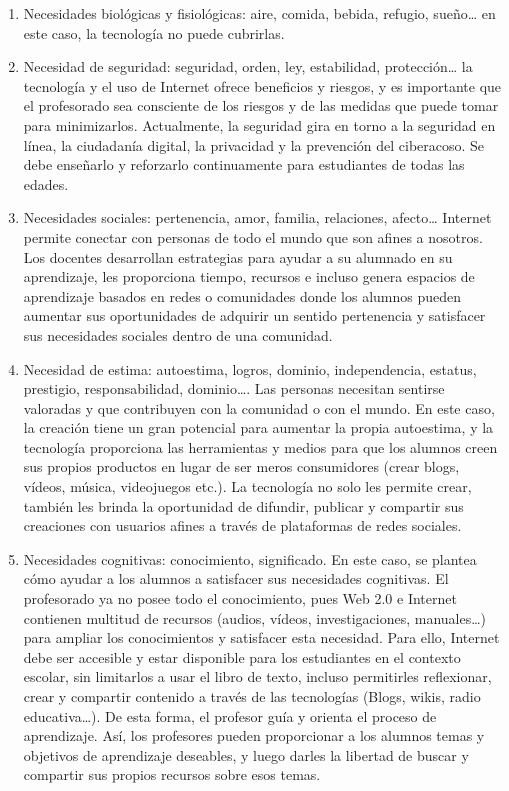 \documentclass[spanish]{textolivre}
\begin{document}
\begin{enumerate}
    \item Necesidades biológicas y fisiológicas: aire, comida, bebida, refugio, sueño… en este caso, la tecnología no puede cubrirlas.
    \item Necesidad de seguridad: seguridad, orden, ley, estabilidad, protección… la tecnología y el uso de Internet ofrece beneficios y riesgos, y es importante que el profesorado sea consciente de los riesgos y de las medidas que puede tomar para minimizarlos. Actualmente, la seguridad gira en torno a la seguridad en línea, la ciudadanía digital, la privacidad y la prevención del ciberacoso. Se debe enseñarlo y reforzarlo continuamente para estudiantes de todas las edades. 
    \item Necesidades sociales: pertenencia, amor, familia, relaciones, afecto… Internet permite conectar con personas de todo el mundo que son afines a nosotros. Los docentes desarrollan estrategias para ayudar a su alumnado en su aprendizaje, les proporciona tiempo, recursos e incluso genera espacios de aprendizaje basados en redes o comunidades donde los alumnos pueden aumentar sus oportunidades de adquirir un sentido pertenencia y satisfacer sus necesidades sociales dentro de una comunidad. 
    \item Necesidad de estima: autoestima, logros, dominio, independencia, estatus, prestigio, responsabilidad, dominio…. Las personas necesitan sentirse valoradas y que contribuyen con la comunidad o con el mundo. En este caso, la creación tiene un gran potencial para aumentar la propia autoestima, y la tecnología proporciona las herramientas y medios para que los alumnos creen sus propios productos en lugar de ser meros consumidores (crear blogs, vídeos, música, videojuegos etc.). La tecnología no solo les permite crear, también les brinda la oportunidad de difundir, publicar y compartir sus creaciones con usuarios afines a través de plataformas de redes sociales.
    \item Necesidades cognitivas: conocimiento, significado. En este caso, se plantea cómo ayudar a los alumnos a satisfacer sus necesidades cognitivas. El profesorado ya no posee todo el conocimiento, pues Web 2.0 e Internet contienen multitud de recursos (audios, vídeos, investigaciones, manuales…) para ampliar los conocimientos y satisfacer esta necesidad. Para ello, Internet debe ser accesible y estar disponible para los estudiantes en el contexto escolar, sin limitarlos a usar el libro de texto, incluso permitirles reflexionar, crear y compartir contenido a través de las tecnologías (Blogs, wikis, radio educativa…). De esta forma, el profesor guía y orienta el proceso de aprendizaje. Así, los profesores pueden proporcionar a los alumnos temas y objetivos de aprendizaje deseables, y luego darles la libertad de buscar y compartir sus propios recursos sobre esos temas.

\end{enumerate}
\end{document}
